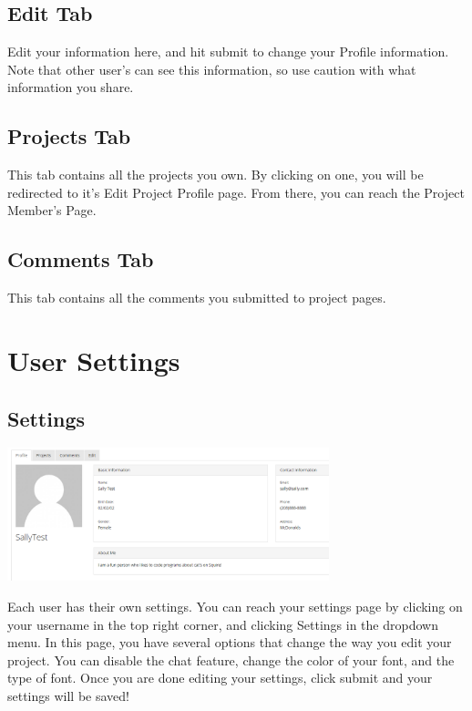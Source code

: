 \documentclass[11pt]{report}
\begin{document}
\section{Edit Tab}
Edit your information here, and hit submit to change your Profile information. Note that other user's can see this information, so use caution with what information you share.

\section{Projects Tab}
This tab contains all the projects you own. By clicking on one, you will be redirected to it's Edit Project Profile page. From there, you can reach the Project Member's Page.

\section{Comments Tab}
This tab contains all the comments you submitted to project pages. 


\chapter{User Settings}

\section{Settings}
	\begin{center}
           \includegraphics[width=0.7\textwidth]{profile.png}
    \end{center}
Each user has their own settings. You can reach your settings page by clicking on your username in the top right corner, and clicking Settings in the dropdown menu. In this page, you have several options that change the way you edit your project. You can disable the chat feature, change the color of your font, and the type of font. Once you are done editing your settings, click submit and your settings will be saved!


   
\end{document}
